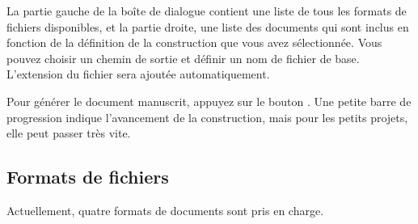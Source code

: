\documentclass[a4paper,11pt,french]{sphinxmanual}
\begin{document}
\sphinxAtStartPar
La partie gauche de la boîte de dialogue contient une liste de tous les formats de fichiers disponibles, et la partie droite, une liste des documents qui sont inclus en fonction de la définition de la construction que vous avez sélectionnée. Vous pouvez choisir un chemin de sortie et définir un nom de fichier de base. L’extension du fichier sera ajoutée automatiquement.

\sphinxAtStartPar
Pour générer le document manuscrit, appuyez sur le bouton . Une petite barre de progression indique l’avancement de la construction, mais pour les petits projets, elle peut passer très vite.


\subsection{Formats de fichiers}
\label{\detokenize{project_manuscript:file-formats}}
\sphinxAtStartPar
Actuellement, quatre formats de documents sont pris en charge.
\end{document}

